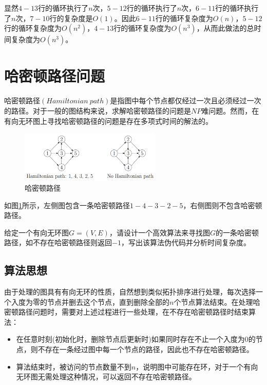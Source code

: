 \documentclass{article}
\begin{document}
显然$4-13$行的循环执行了$n$次，$5-12$行的循环执行了$n$次，$6-11$行的循环执行了$n$次，$7-10$行的复杂度是$O(1)$。因此$6-11$行的循环复杂度为$O(n)$，$5-12$行的循环复杂度为$O(n^2)$，$4-13$行的循环复杂度为$O(n^3)$，从而此做法的总时间复杂度为$O(n^3)$。

\section{哈密顿路径问题}

哈密顿路径$(Hamiltonian\ path)$是指图中每个节点都仅经过一次且必须经过一次的路径。对于一般的图结构来说，求解哈密顿路径的问题是$NP$难问题。然而，在有向无环图上寻找哈密顿路径的问题是存在多项式时间的解法的。

\begin{figure}[H]
\centering
\includegraphics[width=0.6\textwidth]{algorithm_pic2.jpg}
\caption{哈密顿路径}
\label{哈密顿路径}
\end{figure}

如图\ref{哈密顿路径}所示，左侧图包含一条哈密顿路径$1-4-3-2-5$，右侧图则不包含哈密顿路径。

给定一个有向无环图$G=(V,E)$，请设计一个高效算法来寻找图$G$的一条哈密顿路径，如不存在哈密顿路径则返回$−1$，写出该算法伪代码并分析时间复杂度。

\subsection{算法思想}

由于处理的图具有有向无环的性质，自然想到类似拓扑排序进行处理，每次选择一个入度为零的节点并删去这个节点，直到删除全部的$n$个节点算法结束。在处理哈密顿路径问题时，需要对上述过程进行一些处理，在不存在哈密顿路径时结束算法：

\begin{itemize}[itemindent=3em]
    \item{在任意时刻(初始化时，删除节点后更新时)如果同时存在不止一个入度为$0$的节点，则不存在一条经过图中每一个节点的路径，因此也不存在哈密顿路径。}
    \item{算法结束时，被访问的节点数量不到$n$，说明图中可能存在环，对于一个有向无环图无需处理这种情况，可以返回不存在哈密顿路径。}
\end{itemize}
\end{document}
